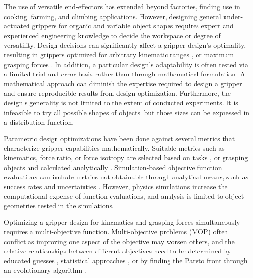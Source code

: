 \documentclass[letterpaper, 10 pt, conference]{ieeeconf}  %
\begin{document}
The use of versatile end-effectors has extended beyond factories, finding use in cooking, farming, and climbing applications.
However, designing general under-actuated grippers for organic and variable object shapes requires expert and experienced engineering knowledge to decide the workspace or degree of versatility. 
Design decisions can significantly affect a gripper design's optimality, resulting in grippers optimized for arbitrary kinematic ranges \cite{kinematic_optimization}, or maximum grasping forces \cite{underactuated_tendon}. 
In addition, a particular design's adaptability is often tested via a limited trial-and-error basis rather than through mathematical formulation. A mathematical approach can diminish the expertise required to design a gripper and ensure reproducible results from design optimization. Furthermore, the design's generality is not limited to the extent of conducted experiments. It is infeasible to try all possible shapes of objects, but those sizes can be expressed in a distribution function.

Parametric design optimizations have been done against several metrics that characterize gripper capabilities mathematically. Suitable metrics such as kinematics, force ratio, or force isotropy are selected based on tasks \cite{orient_opti}, or grasping objects and calculated analytically \cite{surgerry_opti}. Simulation-based objective function evaluations can include metrics not obtainable through analytical means, such as success rates and uncertainties \cite{sensitive_grasp}. 
However, physics simulations increase the computational expense of function evaluations, and analysis is limited to object geometries tested in the simulations. 

 Optimizing a gripper design for kinematics and grasping forces simultaneously requires a multi-objective function.
 Multi-objective problems (MOP) often conflict as improving one aspect of the objective may worsen others, and the relative relationships between different objectives need to be determined by educated guesses \cite{surgerry_opti}, statistical approaches \cite{multiobject_design}, or by finding the Pareto front through an evolutionary algorithm \cite{opti_evolutionary}.
 
\end{document}
